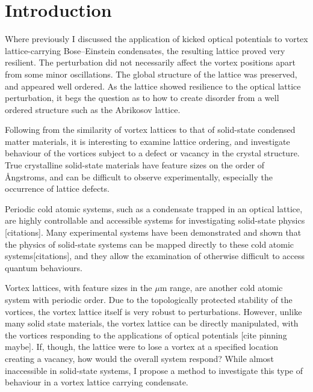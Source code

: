 \section{Introduction}\label{sec:ch6_intro}
Where previously I discussed the application of kicked optical potentials to vortex lattice-carrying Bose--Einstein condensates, the resulting lattice proved very resilient. The perturbation did not necessarily affect the vortex positions apart from some minor oscillations. The global structure of the lattice was preserved, and appeared well ordered. As the lattice showed resilience to the optical lattice perturbation, it begs the question as to how to create disorder from a well ordered structure such as the Abrikosov lattice.

Following from the similarity of vortex lattices to that of solid-state condensed matter materials, it is interesting to examine lattice ordering, and investigate behaviour of the vortices subject to a defect or vacancy in the crystal structure. True crystalline solid-state materials have feature sizes on the order of {\AA}ngstroms, and can be difficult to observe experimentally, especially the occurrence of lattice defects.

Periodic cold atomic systems, such as a condensate trapped in an optical lattice, are highly controllable and accessible systems for investigating solid-state physics [citations]. Many experimental systems have been demonstrated and shown that the physics of solid-state systems can be mapped directly to these cold atomic systems[citations], and they allow the examination of otherwise difficult to access quantum behaviours.

Vortex lattices, with feature sizes in the $\mu$m range, are another cold atomic system with periodic order. Due to the topologically protected stability of the vortices, the vortex lattice itself is very robust to perturbations. However, unlike many solid state materials, the vortex lattice can be directly manipulated, with the vortices responding to the applications of optical potentials [cite pinning maybe]. If, though, the lattice were to lose a vortex at a specified location creating a vacancy, how would the overall system respond? While almost inaccessible in solid-state systems, I propose a method to investigate this type of behaviour in a vortex lattice carrying condensate.

